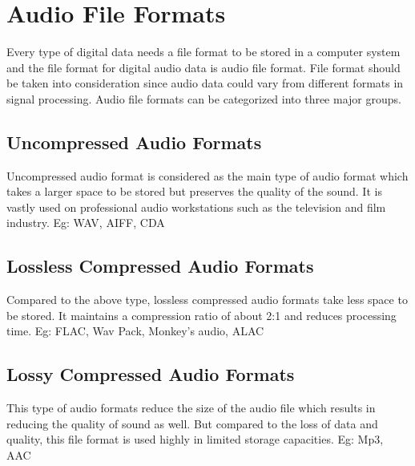 \section{Audio File Formats}

Every type of digital data needs a file format to be stored in a computer 
system and the file format for digital audio data is audio file format. 
File format should be taken into consideration since audio data could vary 
from different formats in signal processing. Audio file formats can be 
categorized into three major groups.

\subsection{Uncompressed Audio Formats}

Uncompressed audio format is considered as the main type of audio format which takes a larger 
space to be stored but preserves the quality of the sound. It is vastly used on professional 
audio workstations such as the television and film industry.
Eg: WAV, AIFF, CDA


\subsection{Lossless Compressed Audio Formats}

Compared to the above type, lossless compressed audio formats take less space to be stored. 
It maintains a compression ratio of about 2:1 and reduces processing time.
Eg: FLAC, Wav Pack, Monkey’s audio, ALAC


\subsection{Lossy Compressed Audio Formats}

This type of audio formats reduce the size of the audio file which results in reducing the 
quality of sound as well. But compared to the loss of data and quality, this file format is 
used highly in limited storage capacities.
Eg: Mp3, AAC
